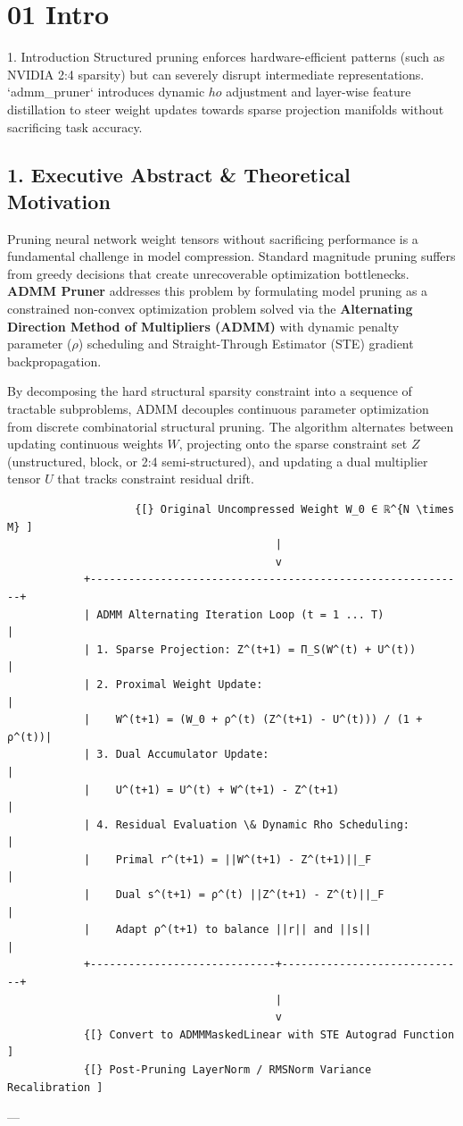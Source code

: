 \section{01 Intro}

 1. Introduction
Structured pruning enforces hardware-efficient patterns (such as NVIDIA 2:4 sparsity) but can severely disrupt intermediate representations. `admm\_pruner` introduces dynamic $
ho$ adjustment and layer-wise feature distillation to steer weight updates towards sparse projection manifolds without sacrificing task accuracy.



\subsection{1. Executive Abstract \& Theoretical Motivation}
Pruning neural network weight tensors without sacrificing performance is a fundamental challenge in model compression. Standard magnitude pruning suffers from greedy decisions that create unrecoverable optimization bottlenecks. \textbf{ADMM Pruner} addresses this problem by formulating model pruning as a constrained non-convex optimization problem solved via the \textbf{Alternating Direction Method of Multipliers (ADMM)} with dynamic penalty parameter ($\rho$) scheduling and Straight-Through Estimator (STE) gradient backpropagation.

By decomposing the hard structural sparsity constraint into a sequence of tractable subproblems, ADMM decouples continuous parameter optimization from discrete combinatorial structural pruning. The algorithm alternates between updating continuous weights $W$, projecting onto the sparse constraint set $Z$ (unstructured, block, or 2:4 semi-structured), and updating a dual multiplier tensor $U$ that tracks constraint residual drift.


\begin{lstlisting}
                    {[} Original Uncompressed Weight W_0 ∈ ℝ^{N \times  M} ]
                                          |
                                          v
            +-----------------------------------------------------------+
            | ADMM Alternating Iteration Loop (t = 1 ... T)             |
            | 1. Sparse Projection: Z^(t+1) = Π_S(W^(t) + U^(t))        |
            | 2. Proximal Weight Update:                                |
            |    W^(t+1) = (W_0 + ρ^(t) (Z^(t+1) - U^(t))) / (1 + ρ^(t))|
            | 3. Dual Accumulator Update:                               |
            |    U^(t+1) = U^(t) + W^(t+1) - Z^(t+1)                    |
            | 4. Residual Evaluation \& Dynamic Rho Scheduling:          |
            |    Primal r^(t+1) = ||W^(t+1) - Z^(t+1)||_F               |
            |    Dual s^(t+1) = ρ^(t) ||Z^(t+1) - Z^(t)||_F             |
            |    Adapt ρ^(t+1) to balance ||r|| and ||s||               |
            +-----------------------------+-----------------------------+
                                          |
                                          v
            {[} Convert to ADMMMaskedLinear with STE Autograd Function ]
            {[} Post-Pruning LayerNorm / RMSNorm Variance Recalibration ]
\end{lstlisting}


---
